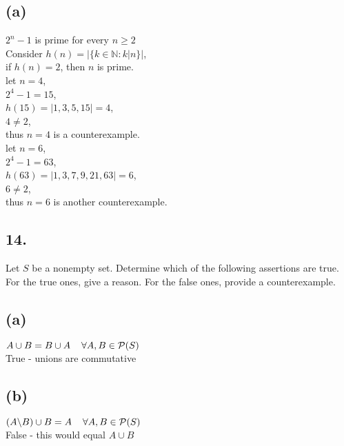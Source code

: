 \documentclass[11pt]{article}
\begin{document}
\subsection*{(a)}
\begin{center}
$2^{n} - 1$ is prime for every $n \geq 2$\\
\hfill \break
Consider $h(n) = |\{k \in \mathbb{N} : k|n\}|$,\\
if $h(n) = 2$, then $n$ is prime.\\
let $n = 4$,\\
$2^{4} - 1 = 15$,\\
$h(15) = |1,3,5,15| = 4$,\\
$4 \neq 2$,\\
thus $n = 4$ is a counterexample.\\
let $n = 6$,\\
$2^{4} - 1 = 63$,\\
$h(63) = |1,3,7,9,21,63| = 6$,\\
$6 \neq 2$,\\
thus $n = 6$ is another counterexample.
\end{center}
%
%
\subsection*{14.}
\begin{center}
Let $S$ be a nonempty set. Determine which of the following assertions are true.\\
For the true ones, give a reason. For the false ones, provide a counterexample.
\end{center}

\subsection*{(a)}
\begin{center}
$A \cup B = B \cup A \hspace{4mm} \forall A,B \in \mathcal{P}(S)$\\
\hfill \break
True - unions are commutative
\end{center}

\subsection*{(b)}
\begin{center}
$(A \backslash B) \cup B = A \hspace{4mm} \forall A,B \in \mathcal{P}(S)$\\
\hfill \break
False - this would equal $A \cup B$
\end{center}
\end{document}
